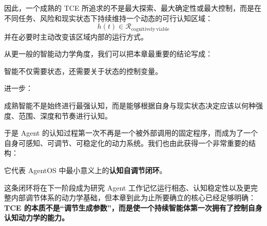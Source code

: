 因此，一个成熟的 TCE 所追求的不是最大探索、最大确定性或最大控制，而是在不同任务、风险和现实状态下持续维持一个动态的可行认知区域：
\begin{equation}
    \boxed{
    h(t)
    \in
    \mathcal R_{\mathrm{cognitively\ viable}}
    }
\end{equation}
并在必要时主动改变该区域内部的运行方式。

从更一般的智能动力学角度，我们可以把本章最重要的结论写成：
\begin{statementbox}
智能不仅需要状态，还需要关于状态的控制变量。
\end{statementbox}
进一步：
\begin{statementbox}
成熟智能不是始终进行最强认知，而是能够根据自身与现实状态决定应该以何种强度、范围、深度和节奏进行认知。
\end{statementbox}

于是 Agent 的认知过程第一次不再是一个被外部调用的固定程序，而成为了一个自身可感知、可调节、可稳定化的动力系统。我们也由此获得一个非常重要的结构：

\begin{statementbox}
\centering
{}
\end{statementbox}

它代表 AgentOS 中最小意义上的\textbf{认知自调节闭环}。

这条闭环将在下一阶段成为研究 Agent 工作记忆运行相态、认知稳定性以及更完整内部调节体系的动力学基础，但本章到此为止所要确立的核心已经足够明确：\textbf{TCE 的本质不是“调节生成参数”，而是使一个持续智能体第一次拥有了控制自身认知动力学的能力。}
